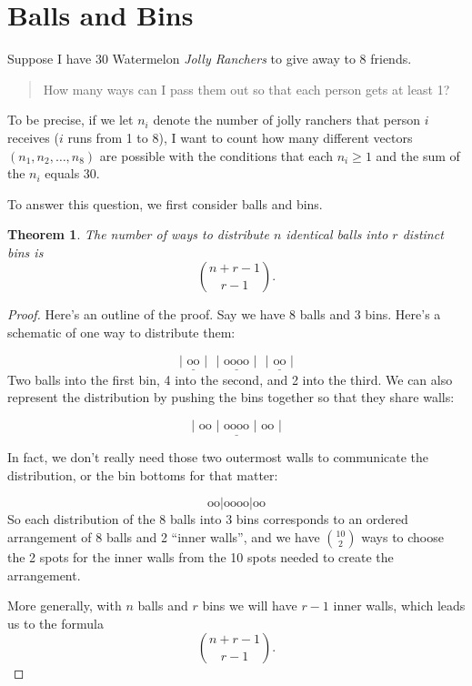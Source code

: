 \documentclass[
]{book}
\newtheorem{theorem}{Theorem}[chapter]
\theoremstyle{definition}
\theoremstyle{definition}
\theoremstyle{definition}
\theoremstyle{definition}
\theoremstyle{remark}
\begin{document}
\section{Balls and Bins}\label{balls-and-bins}

Suppose I have 30 Watermelon \emph{Jolly Ranchers} to give away to 8 friends.

\begin{quote}
How many ways can I pass them out so that each person gets at least 1?
\end{quote}

To be precise, if we let \(n_i\) denote the number of jolly ranchers that person \(i\) receives (\(i\) runs from 1 to 8), I want to count how many different vectors \((n_1, n_2, \ldots, n_8)\) are possible with the conditions that each \(n_i \geq 1\) and the sum of the \(n_i\) equals 30.

To answer this question, we first consider balls and bins.

\begin{theorem}
\protect\hypertarget{thm:distribute-identical-balls-into-distinct-bins}{}\label{thm:distribute-identical-balls-into-distinct-bins}The number of ways to distribute \(n\) identical balls into \(r\) distinct bins is \[\binom{n+r-1}{r-1}.\]
\end{theorem}

\begin{proof}
Here's an outline of the proof. Say we have 8 balls and 3 bins. Here's a schematic of one way to distribute them:

\[\underline{\vert \text{ oo } \vert}~~~\underline{\vert \text{ oooo } \vert} ~~~ \underline{\vert \text{ oo } \vert}\]
Two balls into the first bin, 4 into the second, and 2 into the third. We can also represent the distribution by pushing the bins together so that they share walls:

\[\underline{\vert \text{ oo } \vert \text{ oooo } \vert \text{ oo } \vert}\]

In fact, we don't really need those two outermost walls to communicate the distribution, or the bin bottoms for that matter:

\[ \text{oo} \vert \text{oooo} \vert \text{oo}\]
So each distribution of the 8 balls into 3 bins corresponds to an ordered arrangement of 8 balls and 2 ``inner walls'', and we have \(\displaystyle\binom{10}{2}\) ways to choose the 2 spots for the inner walls from the 10 spots needed to create the arrangement.

More generally, with \(n\) balls and \(r\) bins we will have \(r-1\) inner walls, which leads us to the formula \[\binom{n+r-1}{r-1}.\]
\end{proof}
\end{document}
